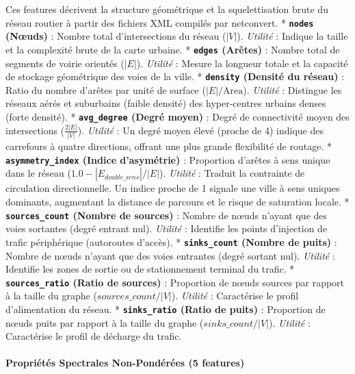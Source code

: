 \documentclass[10pt, a4paper]{article}
\begin{document}
Ces features décrivent la structure géométrique et la squelettisation
brute du réseau routier à partir des fichiers XML compilés par
netconvert. * \textbf{\texttt{nodes} (Nœuds)} : Nombre total
d'intersections du réseau (\(|V|\)). \emph{Utilité} : Indique la taille
et la complexité brute de la carte urbaine. * \textbf{\texttt{edges}
(Arêtes)} : Nombre total de segments de voirie orientés (\(|E|\)).
\emph{Utilité} : Mesure la longueur totale et la capacité de stockage
géométrique des voies de la ville. * \textbf{\texttt{density} (Densité
du réseau)} : Ratio du nombre d'arêtes par unité de surface
(\(|E|/\text{Area}\)). \emph{Utilité} : Distingue les réseaux aérés et
suburbains (faible densité) des hyper-centres urbains denses (forte
densité). * \textbf{\texttt{avg\_degree} (Degré moyen)} : Degré de
connectivité moyen des intersections (\(\frac{2|E|}{|V|}\)).
\emph{Utilité} : Un degré moyen élevé (proche de 4) indique des
carrefours à quatre directions, offrant une plus grande flexibilité de
routage. * \textbf{\texttt{asymmetry\_index} (Indice d'asymétrie)} :
Proportion d'arêtes à sens unique dans le réseau
(\(1.0 - |E_{double\_sens}|/|E|\)). \emph{Utilité} : Traduit la
contrainte de circulation directionnelle. Un indice proche de 1 signale
une ville à sens uniques dominants, augmentant la distance de parcours
et le risque de saturation locale. * \textbf{\texttt{sources\_count}
(Nombre de sources)} : Nombre de nœuds n'ayant que des voies sortantes
(degré entrant nul). \emph{Utilité} : Identifie les points d'injection
de trafic périphérique (autoroutes d'accès). *
\textbf{\texttt{sinks\_count} (Nombre de puits)} : Nombre de nœuds
n'ayant que des voies entrantes (degré sortant nul). \emph{Utilité} :
Identifie les zones de sortie ou de stationnement terminal du trafic. *
\textbf{\texttt{sources\_ratio} (Ratio de sources)} : Proportion de
nœuds sources par rapport à la taille du graphe
(\(sources\_count/|V|\)). \emph{Utilité} : Caractérise le profil
d'alimentation du réseau. * \textbf{\texttt{sinks\_ratio} (Ratio de
puits)} : Proportion de nœuds puits par rapport à la taille du graphe
(\(sinks\_count/|V|\)). \emph{Utilité} : Caractérise le profil de
décharge du trafic.

\paragraph{Propriétés Spectrales Non-Pondérées (5
features)}\label{propriuxe9tuxe9s-spectrales-non-ponduxe9ruxe9es-5-features}
\end{document}
